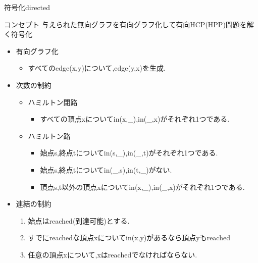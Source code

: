 \documentclass[dvipdfmx,11pt]{beamer}
\begin{document}
\begin{frame}[fragile]{符号化directed}
  \begin{alertblock}{コンセプト}
    与えられた無向グラフを有向グラフ化して有向HCP(HPP)問題を解く符号化
  \end{alertblock}
  \begin{itemize}
  \item \alert{有向グラフ化}
    \begin{itemize}
    \item すべてのedge(x,y)について,edge(y,x)を生成.
    \end{itemize}
  \item \alert{次数の制約}
    \begin{itemize}
    \item ハミルトン閉路
      \begin{itemize}
      \item すべての頂点xについてin(x,\_),in(\_,x)がそれぞれ1つである.
      \end{itemize}
    \item ハミルトン路
      \begin{itemize}
      \item 始点s,終点tについてin(s,\_),in(\_,t)がそれぞれ1つである.
      \item 始点s,終点tについてin(\_,s),in(t,\_)がない.
      \item 頂点s,t以外の頂点xについてin(x,\_),in(\_,x)がそれぞれ1つである.
      \end{itemize}
    \end{itemize}
  \item \alert{連結の制約}
    \begin{enumerate}
    \item 始点はreached(到達可能)とする.
    \item すでにreachedな頂点xについてin(x,y)があるなら頂点yもreached
    \item 任意の頂点xについて,xはreachedでなければならない.
    \end{enumerate}
  \end{itemize}
\end{frame}
\end{document}
